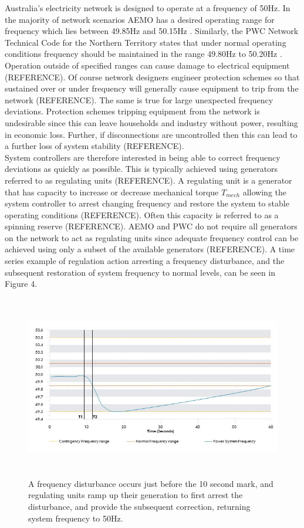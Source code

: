 \documentclass[12pt, a4paper]{article}
\begin{document}
Australia's electricity network is designed to operate at a frequency of 50$\si{\hertz}$. In the majority of network scenarios AEMO has a desired operating range for frequency which lies between 49.85$\si{\hertz}$ and 50.15$\si{\hertz}$ \cite{AEMO2012}. Similarly, the PWC Network Technical Code for the Northern Territory states that under normal operating conditions frequency should be maintained in the range 49.80$\si{\hertz}$ to 50.20$\si{\hertz}$ \cite{PWC2018}. Operation outside of specified ranges can cause damage to electrical equipment (REFERENCE). Of course network designers engineer protection schemes so that sustained over or under frequency will generally cause equipment to trip from the network (REFERENCE). The same is true for large unexpected frequency deviations. Protection schemes tripping equipment from the network is undesirable since this can leave households and industry without power, resulting in economic loss. Further, if disconnections are uncontrolled then this can lead to a further loss of system stability (REFERENCE).\\

System controllers are therefore interested in being able to correct frequency deviations as quickly as possible. This is typically achieved using generators referred to as regulating units (REFERENCE). A regulating unit is a generator that has capacity to increase or decrease mechanical torque $T_{mech}$ allowing the system controller to arrest changing frequency and restore the system to stable operating conditions (REFERENCE). Often this capacity is referred to as a spinning reserve (REFERENCE). AEMO and PWC do not require all generators on the network to act as regulating units since adequate frequency control can be achieved using only a subset of the available generators (REFERENCE). A time series example of regulation action arresting a frequency disturbance, and the subsequent restoration of system frequency to normal levels, can be seen in Figure 4.
\begin{figure}[h]
\centering
\includegraphics[height=8cm]{frequency_arrest}
\caption{A frequency disturbance occurs just before the 10 second mark, and regulating units ramp up their generation to first arrest the disturbance, and provide the subsequent correction, returning system frequency to 50$\si{\hertz}$.}
\end{figure}
\end{document}
